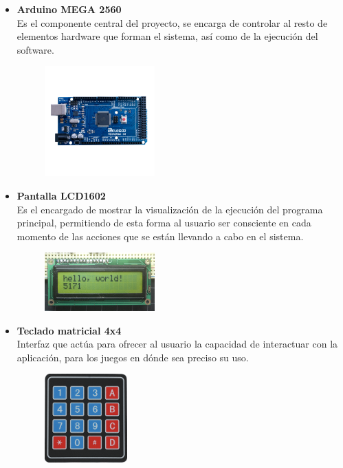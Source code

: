 \begin{itemize}
	\item \textbf{Arduino MEGA 2560}
	\\
	Es el componente central del proyecto, se encarga de controlar al resto de elementos hardware que forman el sistema, así como de la ejecución del software.
	\begin{figure}[h]
    \centering
    \includegraphics[width=0.4\textwidth]{imagenes/arduinomega.jpg}\\[1cm]
    \end{figure}
    
	\item \textbf{Pantalla LCD1602}
	\\
	Es el encargado de mostrar la visualización de la ejecución del programa principal, permitiendo de esta forma al usuario ser consciente en cada momento de las acciones que se están llevando a cabo en el sistema.
	\begin{figure}[h]
    \centering
    \includegraphics[width=0.4\textwidth]{imagenes/pantallalcd.png}\\[1cm]
    \end{figure}
    
	\item \textbf{Teclado matricial 4x4}
	\\
	Interfaz que actúa para ofrecer al usuario la capacidad de interactuar con la aplicación, para los juegos en dónde sea preciso su uso.
	\begin{figure}[h]
    \centering
    \includegraphics[width=0.3\textwidth]{imagenes/teclado4x4.png}\\[0.8cm]
    \end{figure}
    

\end{itemize}

